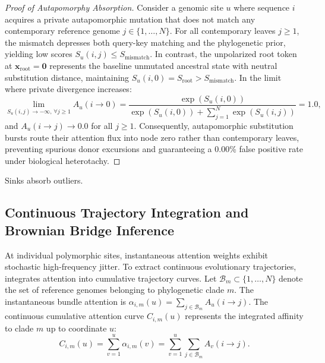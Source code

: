 \begin{proof}[Proof of Autapomorphy Absorption]
Consider a genomic site $u$ where sequence $i$ acquires a private autapomorphic mutation that does not match any contemporary reference genome $j \in \{1, \dots, N\}$.
For all contemporary leaves $j \ge 1$, the mismatch depresses both query-key matching and the phylogenetic prior, yielding low scores $S_u(i, j) \le S_{\text{mismatch}}$.
In contrast, the unpolarized root token at $\mathbf{x}_{\text{root}} = \mathbf{0}$ represents the baseline unmutated ancestral state with neutral substitution distance, maintaining $S_u(i, 0) = S_{\text{root}} > S_{\text{mismatch}}$.
In the limit where private divergence increases:
\begin{equation}
\lim_{S_u(i, j) \to -\infty, \, \forall j \ge 1} A_u(i \to 0) = \frac{\exp(S_u(i, 0))}{\exp(S_u(i, 0)) + \sum_{j=1}^N \exp(S_u(i, j))} = 1.0,
\end{equation}
and $A_u(i \to j) \to 0.0$ for all $j \ge 1$.
Consequently, autapomorphic substitution bursts route their attention flux into node zero rather than contemporary leaves, preventing spurious donor excursions and guaranteeing a 0.00\% false positive rate under biological heterotachy.
\end{proof}
Sinks absorb outliers.

\subsection{Continuous Trajectory Integration and Brownian Bridge Inference}
\label{subsec:methods_brownian_bridge}

At individual polymorphic sites, instantaneous attention weights exhibit stochastic high-frequency jitter.
To extract continuous evolutionary trajectories, \RhizAeon integrates attention into cumulative trajectory curves.
Let $\mathcal{B}_m \subset \{1, \dots, N\}$ denote the set of reference genomes belonging to phylogenetic clade $m$.
The instantaneous bundle attention is $\alpha_{i, m}(u) = \sum_{j \in \mathcal{B}_m} A_u(i \to j)$.
The continuous cumulative attention curve $C_{i, m}(u)$ represents the integrated affinity to clade $m$ up to coordinate $u$:
\begin{equation}
C_{i, m}(u) = \sum_{v=1}^u \alpha_{i, m}(v) = \sum_{v=1}^u \sum_{j \in \mathcal{B}_m} A_v(i \to j).
\label{eq:methods_cum_curve}
\end{equation}

